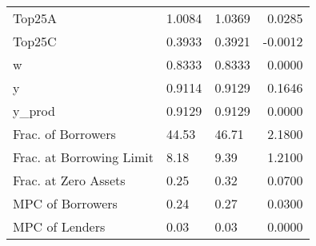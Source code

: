 \begin{table}
\begin{tabular}{lllr}
                  Top25A &  1.0084 &   1.0369 &  0.0285 \\
                  Top25C &  0.3933 &   0.3921 & -0.0012 \\
                       w &  0.8333 &   0.8333 &  0.0000 \\
                       y &  0.9114 &   0.9129 &  0.1646 \\
                  y\_prod &  0.9129 &   0.9129 &  0.0000 \\
      Frac. of Borrowers &   44.53 &    46.71 &  2.1800 \\
Frac. at Borrowing Limit &    8.18 &     9.39 &  1.2100 \\
    Frac. at Zero Assets &    0.25 &     0.32 &  0.0700 \\
        MPC of Borrowers &    0.24 &     0.27 &  0.0300 \\
          MPC of Lenders &    0.03 &     0.03 &  0.0000 \\
\bottomrule
\end{tabular}
\end{table}
